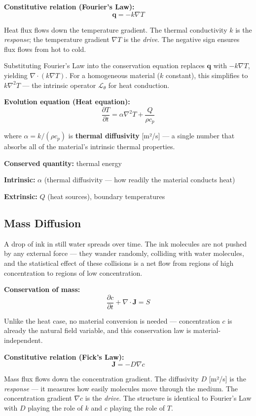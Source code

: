 \documentclass[
  letterpaper,
  DIV=11,
  numbers=noendperiod]{scrartcl}
\begin{document}
\textbf{Constitutive relation (Fourier's Law):}
\[\mathbf{q} = -k\nabla T\]

Heat flux flows down the temperature gradient. The thermal conductivity
\(k\) is the \emph{response}; the temperature gradient \(\nabla T\) is
the \emph{drive}. The negative sign ensures flux flows from hot to cold.

Substituting Fourier's Law into the conservation equation replaces
\(\mathbf{q}\) with \(-k\nabla T\), yielding
\(\nabla \cdot (k \nabla T)\). For a homogeneous material (\(k\)
constant), this simplifies to \(k \nabla^2 T\) --- the intrinsic
operator \(\mathcal{L}_\theta\) for heat conduction.

\textbf{Evolution equation (Heat equation):}
\[\frac{\partial T}{\partial t} = \alpha \nabla^2 T + \frac{Q}{\rho c_p}\]

where \(\alpha = k/(\rho c_p)\) is \textbf{thermal diffusivity}
{[}m²/s{]} --- a single number that absorbs all of the material's
intrinsic thermal properties.

\textbf{Conserved quantity:} thermal energy

\textbf{Intrinsic:} \(\alpha\) (thermal diffusivity --- how readily the
material conducts heat)

\textbf{Extrinsic:} \(Q\) (heat sources), boundary temperatures

\subsection{Mass Diffusion}\label{mass-diffusion}

A drop of ink in still water spreads over time. The ink molecules are
not pushed by any external force --- they wander randomly, colliding
with water molecules, and the statistical effect of these collisions is
a net flow from regions of high concentration to regions of low
concentration.

\textbf{Conservation of mass:}
\[\frac{\partial c}{\partial t} + \nabla \cdot \mathbf{J} = S\]

Unlike the heat case, no material conversion is needed --- concentration
\(c\) is already the natural field variable, and this conservation law
is material-independent.

\textbf{Constitutive relation (Fick's Law):} \[\mathbf{J} = -D\nabla c\]

Mass flux flows down the concentration gradient. The diffusivity \(D\)
{[}m²/s{]} is the \emph{response} --- it measures how easily molecules
move through the medium. The concentration gradient \(\nabla c\) is the
\emph{drive}. The structure is identical to Fourier's Law with \(D\)
playing the role of \(k\) and \(c\) playing the role of \(T\).
\end{document}
